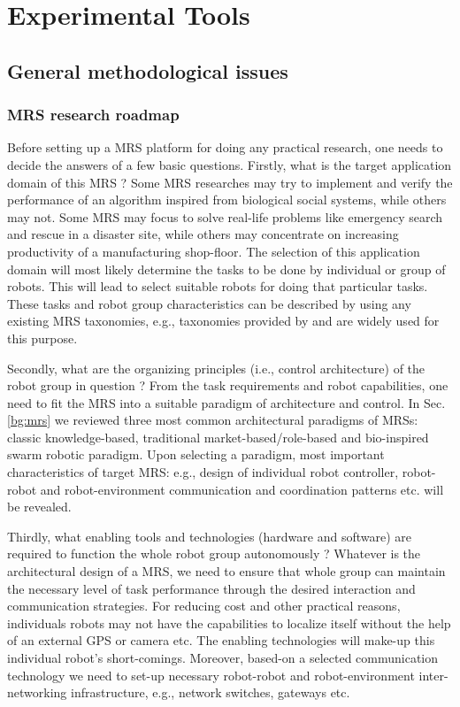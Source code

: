 \chapter{Experimental Tools}
\section{General methodological issues}
\subsection{MRS research roadmap}
\label{expt-tools:mrs-design}
Before setting up a MRS platform for doing any practical research, one needs to decide the answers of  a few basic questions. 
Firstly, what  is the target application domain of this MRS ? Some MRS researches may try to implement and verify the performance of an algorithm inspired from biological social systems, while others may not. Some MRS may focus to solve real-life problems like emergency search and rescue in a disaster site, while others may concentrate on increasing productivity of a manufacturing shop-floor.  The selection of this application domain will most likely determine the tasks to be done by individual or group of robots. This will lead to select suitable robots for doing that particular tasks. These tasks and robot group characteristics can be described by using any existing MRS taxonomies, e.g.,  taxonomies provided by   \cite{Gerkey+2004} and \cite{Dudek+1996} are widely used for this purpose. 

Secondly,  what are the organizing principles (i.e., control architecture) of  the robot group in question ? From the task requirements and robot capabilities,  one need to fit the MRS into a suitable paradigm of architecture and control. In Sec. \ref{bg:mrs} we reviewed three most common architectural paradigms of MRSs: classic knowledge-based, traditional market-based/role-based and bio-inspired swarm robotic paradigm. Upon selecting a paradigm, most important characteristics of target MRS: e.g., design of individual robot controller, robot-robot and robot-environment communication and coordination patterns etc. will be revealed.

Thirdly, what enabling tools and technologies (hardware and software) are required to function the whole robot group autonomously ? Whatever is the architectural design of a MRS, we need to ensure that whole group can maintain the necessary level of task performance through the desired interaction and communication strategies. For reducing cost and other practical reasons, individuals robots may not have the capabilities to localize itself without the help of an external GPS or camera etc. The enabling technologies will make-up this individual robot's short-comings. Moreover, based-on a selected communication technology we need to set-up necessary robot-robot and robot-environment inter-networking infrastructure, e.g., network switches, gateways etc.

